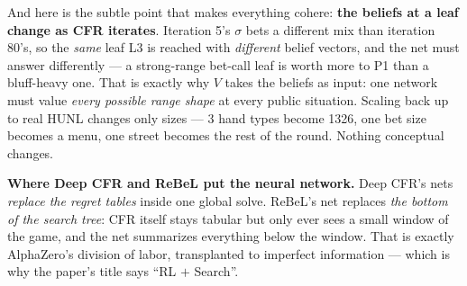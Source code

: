 \documentclass[11pt,a4paper]{article}
\begin{document}
\begin{center}
\end{center}

And here is the subtle point that makes everything cohere: \textbf{the
beliefs at a leaf change as CFR iterates}. Iteration 5's $\sigma$ bets a
different mix than iteration 80's, so the \emph{same} leaf L3 is reached
with \emph{different} belief vectors, and the net must answer differently
--- a strong-range bet-call leaf is worth more to P1 than a bluff-heavy one.
That is exactly why $V$ takes the beliefs as input: one network must value
\emph{every possible range shape} at every public situation. Scaling back
up to real HUNL changes only sizes --- 3 hand types become 1326, one bet
size becomes a menu, one street becomes the rest of the round. Nothing
conceptual changes.

\begin{intuition}
\textbf{Where Deep CFR and ReBeL put the neural network.} Deep CFR's nets
\emph{replace the regret tables} inside one global solve. ReBeL's net replaces
\emph{the bottom of the search tree}: CFR itself stays tabular but only ever
sees a small window of the game, and the net summarizes everything below the
window. That is exactly AlphaZero's division of labor, transplanted to
imperfect information --- which is why the paper's title says ``RL $+$
Search''.
\end{intuition}
\end{document}
